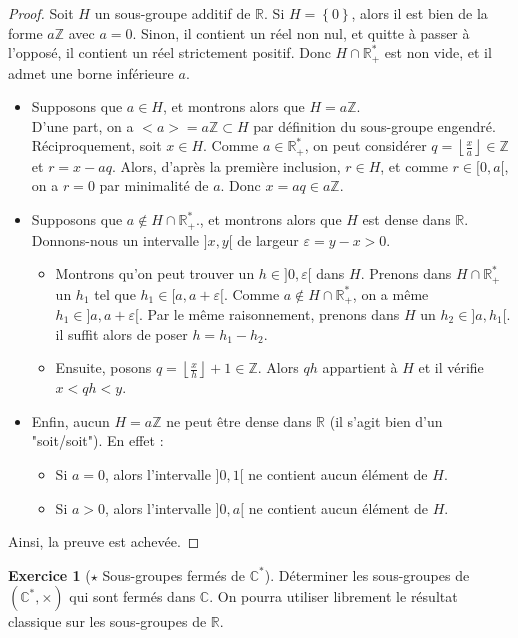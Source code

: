 \documentclass[french]{book}
\newcommand{\Z}{\mathbb{Z}}
\newcommand{\R}{\mathbb{R}}
\newcommand{\C}{\mathbb{C}}
\newcommand{\st}{^*}
\theoremstyle{definition}
\newtheorem{ex}{Exercice}[chapter]
\theoremstyle{theorem}
\theoremstyle{remark}
\begin{document}
\begin{proof}
	Soit $H$ un sous-groupe additif de $\R$. Si $H=\left\{0\right\}$, alors il est bien de la forme $a\Z$ avec $a=0$. Sinon, il contient un réel non nul, et quitte à passer à l'opposé, il contient un réel strictement positif. Donc $H\cap\R_+\st$ est non vide, et il admet une borne inférieure $a$.
	\begin{itemize}
		\item Supposons que $a\in H$, et montrons alors que $H=a\Z$. \\ D'une part, on a $<a>=a\Z\subset H$ par définition du sous-groupe engendré. Réciproquement, soit $x\in H$. Comme $a\in\R_+\st$, on peut considérer $q=\displaystyle\left\lfloor\frac{x}{a}\right\rfloor\in\Z$ et $r=x-aq$. Alors, d'après la première inclusion, $r\in H$, et comme $r\in[0,a[$, on a $r=0$ par minimalité de $a$. Donc $x=aq\in a\Z$.
		\item Supposons que $a\notin H\cap\R_+\st$., et montrons alors que $H$ est dense dans $\R$. \\ Donnons-nous un intervalle $]x,y[$ de largeur $\varepsilon=y-x>0$.
		\begin{itemize}
			\item Montrons qu'on peut trouver un $h\in]0,\varepsilon[$ dans $H$. Prenons dans $H\cap\R_+\st$ un $h_1$ tel que $h_1\in[a,a+\varepsilon[$. Comme $a\notin H\cap\R_+\st$, on a même $h_1\in]a,a+\varepsilon[$. Par le même raisonnement, prenons dans $H$ un $h_2\in]a,h_1[$. il suffit alors de poser $h=h_1-h_2$.
			\item Ensuite, posons $q=\displaystyle\left\lfloor\frac{x}{h}\right\rfloor+1\in\Z$. Alors $qh$ appartient à $H$ et il vérifie $x<qh<y$.
		\end{itemize}
		\item Enfin, aucun $H=a\Z$ ne peut être dense dans $\R$ (il s'agit bien d'un "soit/soit"). En effet :
		\begin{itemize}
			\item Si $a=0$, alors l'intervalle $]0,1[$ ne contient aucun élément de $H$.
			\item Si $a>0$, alors l'intervalle $]0,a[$ ne contient aucun élément de $H$.
		\end{itemize}
	\end{itemize}
	Ainsi, la preuve est achevée.
\end{proof}

\begin{ex}[$\star$ Sous-groupes fermés de $\C\st$]
	Déterminer les sous-groupes de $(\C\st,\times)$ qui sont fermés dans $\C$. On pourra utiliser librement le résultat classique sur les sous-groupes de $\R$.
\end{ex}
\end{document}
